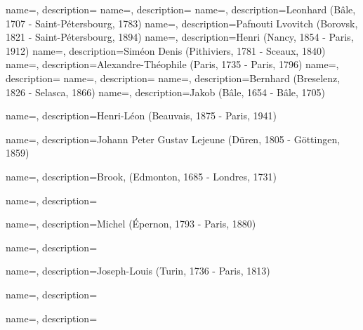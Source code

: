  {
    name=,
    description={}
    }
%
 {
    name=,
    description={}
    }
%
 {
    name=,
    description={Leonhard (Bâle, 1707 -  Saint-Pétersbourg, 1783)}
    }
%
 {
    name=,
    description={Pafnouti Lvovitch (Borovsk, 1821 - Saint-Pétersbourg, 1894)}
    }
%   
 {
    name=,
    description={Henri (Nancy, 1854 - Paris, 1912)}
}
 {
    name=,
    description={Siméon Denis (Pithiviers, 1781 - Sceaux, 1840)}
}
%    
 {
    name=,
    description={Alexandre-Théophile (Paris, 1735 - Paris, 1796)}
    }
%    
 {
    name=,
    description={}
    }
%
 {
    name=,
    description={}
    }
%   
 {
    name=,
    description={Bernhard (Breselenz, 1826 - Selasca, 1866)}
    }
%
 {
    name=,
    description={Jakob (Bâle, 1654 - Bâle, 1705)}
    }
    
 {
    name=,
    description={Henri-Léon (Beauvais, 1875 - Paris, 1941)}
    }
    
 {
    name=,
    description={Johann Peter Gustav Lejeune (Düren, 1805 - Göttingen, 1859)}
    }
    
 {
    name=,
    description={Brook, (Edmonton, 1685 - Londres, 1731)}
}

 {
    name=,
    description={}
    }
    
 {
    name=,
    description={Michel (Épernon, 1793 - Paris, 1880)}
    }
    
 {
    name=,
    description={}
    }
    
 {
    name=,
    description={Joseph-Louis (Turin, 1736 - Paris, 1813)}
    }
    
 {
    name=,
    description={}
    }
    
 {
    name=,
    description={}
    }
    

